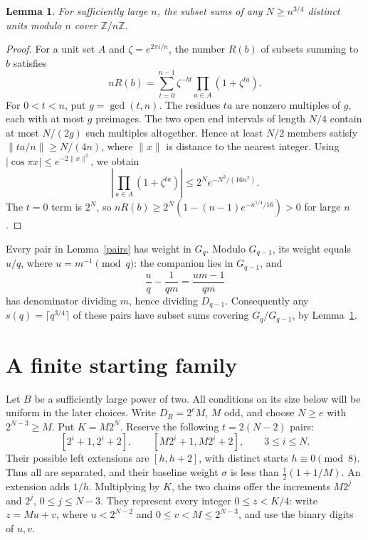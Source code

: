 \documentclass[11pt]{article}
\newtheorem{lemma}{Lemma}
\newcommand{\Z}{\mathbb Z}
\begin{document}
\begin{lemma}\label{subsets}
For sufficiently large \(n\), the subset sums of any \(N\ge n^{3/4}\)
distinct units modulo \(n\) cover \(\Z/n\Z\).
\end{lemma}

\begin{proof}
For a unit set \(A\) and \(\zeta=e^{2\pi i/n}\), the number \(R(b)\)
of subsets summing to \(b\) satisfies
\[
 nR(b)=\sum_{t=0}^{n-1}\zeta^{-bt}\prod_{a\in A}(1+\zeta^{ta}).
\]
For \(0<t<n\), put \(g=\gcd(t,n)\). The residues \(ta\) are
nonzero multiples of \(g\), each with at most \(g\) preimages.
The two open end intervals of length \(N/4\) contain at most
\(N/(2g)\) such multiples altogether.
Hence at least \(N/2\) members satisfy
\(\|ta/n\|\ge N/(4n)\), where \(\|x\|\) is distance to the nearest integer.
Using \(|\cos\pi x|\le e^{-2\|x\|^2}\), we obtain
\[
 \left|\prod_{a\in A}(1+\zeta^{ta})\right|
       \le2^N e^{-N^3/(16n^2)}.
\]
The \(t=0\) term is \(2^N\), so
\(nR(b)\ge2^N(1-(n-1)e^{-n^{1/4}/16})>0\) for large \(n\).
\end{proof}

Every pair in Lemma~\ref{pairs} has weight in \(G_q\).
Modulo \(G_{q-1}\), its weight equals \(u/q\), where
\(u=m^{-1}\pmod q\): the companion lies in \(G_{q-1}\), and
\[
                 \frac uq-\frac1{qm}=\frac{um-1}{qm}
\]
has denominator dividing \(m\), hence dividing \(D_{q-1}\).
Consequently any \(s(q)=\lceil q^{3/4}\rceil\) of these pairs
have subset sums covering \(G_q/G_{q-1}\), by Lemma~\ref{subsets}.

\section{A finite starting family}

Let \(B\) be a sufficiently large power of two. All conditions
on its size below will be uniform in the later choices.
Write \(D_B=2^eM\), \(M\) odd, and choose \(N\ge e\) with
\(2^{N-3}\ge M\). Put \(K=M2^N\).
Reserve the following \(t=2(N-2)\) pairs:
\begin{equation}\label{chains}
 [2^i+1,2^i+2],\qquad[M2^i+1,M2^i+2],
                            \qquad 3\le i\le N.
\end{equation}
Their possible left extensions are \([h,h+2]\), with distinct
starts \(h\equiv0\pmod8\). Thus all are separated, and their
baseline weight \(\sigma\) is less than \(\frac12(1+1/M)\).
An extension adds \(1/h\). Multiplying by \(K\), the two chains
offer the increments \(M2^j\) and \(2^j\), \(0\le j\le N-3\).
They represent every integer \(0\le z<K/4\):
write \(z=Mu+v\), where \(u<2^{N-2}\) and
\(0\le v<M\le2^{N-3}\), and use the binary digits of \(u,v\).
\end{document}
